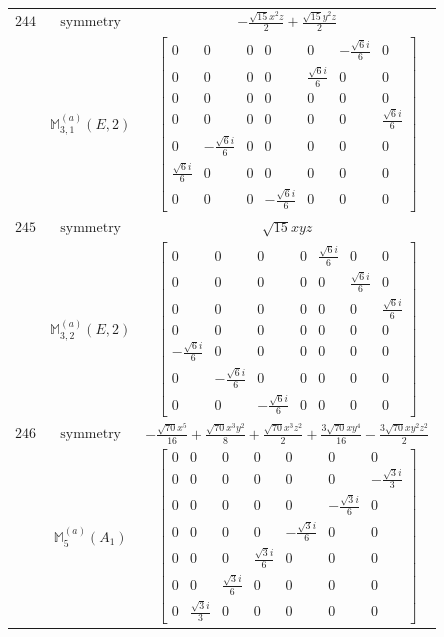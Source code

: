 \documentclass[fleqn,8pt,landscape]{jsarticle}
\begin{document}
\begin{longtable}{ccc}
$ 244 $ & $ \text{symmetry} $ & $ - \frac{\sqrt{15} x^{2} z}{2} + \frac{\sqrt{15} y^{2} z}{2} $ \\
$  $ & $ \mathbb{M}_{3,1}^{(a)}(E,2) $ & $ \begin{bmatrix} 0 & 0 & 0 & 0 & 0 & - \frac{\sqrt{6} i}{6} & 0 \\ 0 & 0 & 0 & 0 & \frac{\sqrt{6} i}{6} & 0 & 0 \\ 0 & 0 & 0 & 0 & 0 & 0 & 0 \\ 0 & 0 & 0 & 0 & 0 & 0 & \frac{\sqrt{6} i}{6} \\ 0 & - \frac{\sqrt{6} i}{6} & 0 & 0 & 0 & 0 & 0 \\ \frac{\sqrt{6} i}{6} & 0 & 0 & 0 & 0 & 0 & 0 \\ 0 & 0 & 0 & - \frac{\sqrt{6} i}{6} & 0 & 0 & 0 \end{bmatrix} $ \\ \hline
$ 245 $ & $ \text{symmetry} $ & $ \sqrt{15} x y z $ \\
$  $ & $ \mathbb{M}_{3,2}^{(a)}(E,2) $ & $ \begin{bmatrix} 0 & 0 & 0 & 0 & \frac{\sqrt{6} i}{6} & 0 & 0 \\ 0 & 0 & 0 & 0 & 0 & \frac{\sqrt{6} i}{6} & 0 \\ 0 & 0 & 0 & 0 & 0 & 0 & \frac{\sqrt{6} i}{6} \\ 0 & 0 & 0 & 0 & 0 & 0 & 0 \\ - \frac{\sqrt{6} i}{6} & 0 & 0 & 0 & 0 & 0 & 0 \\ 0 & - \frac{\sqrt{6} i}{6} & 0 & 0 & 0 & 0 & 0 \\ 0 & 0 & - \frac{\sqrt{6} i}{6} & 0 & 0 & 0 & 0 \end{bmatrix} $ \\ \hline
$ 246 $ & $ \text{symmetry} $ & $ - \frac{\sqrt{70} x^{5}}{16} + \frac{\sqrt{70} x^{3} y^{2}}{8} + \frac{\sqrt{70} x^{3} z^{2}}{2} + \frac{3 \sqrt{70} x y^{4}}{16} - \frac{3 \sqrt{70} x y^{2} z^{2}}{2} $ \\
$  $ & $ \mathbb{M}_{5}^{(a)}(A_{1}) $ & $ \begin{bmatrix} 0 & 0 & 0 & 0 & 0 & 0 & 0 \\ 0 & 0 & 0 & 0 & 0 & 0 & - \frac{\sqrt{3} i}{3} \\ 0 & 0 & 0 & 0 & 0 & - \frac{\sqrt{3} i}{6} & 0 \\ 0 & 0 & 0 & 0 & - \frac{\sqrt{3} i}{6} & 0 & 0 \\ 0 & 0 & 0 & \frac{\sqrt{3} i}{6} & 0 & 0 & 0 \\ 0 & 0 & \frac{\sqrt{3} i}{6} & 0 & 0 & 0 & 0 \\ 0 & \frac{\sqrt{3} i}{3} & 0 & 0 & 0 & 0 & 0 \end{bmatrix} $ \\ \hline

\end{longtable}
\end{document}
